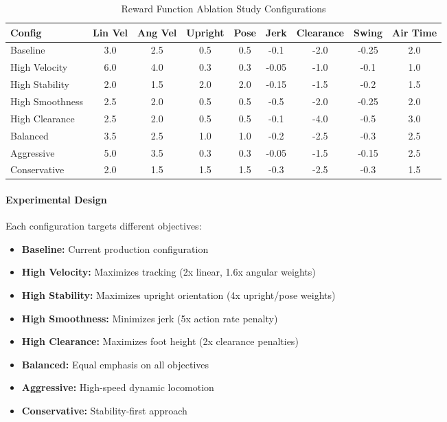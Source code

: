 \documentclass[12pt,a4paper]{article}
\begin{document}
\begin{table}[h]
\centering
\caption{Reward Function Ablation Study Configurations}
\tiny
\begin{tabular}{|l|c|c|c|c|c|c|c|c|}
\hline
\textbf{Config} & \textbf{Lin Vel} & \textbf{Ang Vel} & \textbf{Upright} & \textbf{Pose} & \textbf{Jerk} & \textbf{Clearance} & \textbf{Swing} & \textbf{Air Time} \\
\hline
Baseline & 3.0 & 2.5 & 0.5 & 0.5 & -0.1 & -2.0 & -0.25 & 2.0 \\
\hline
High Velocity & 6.0 & 4.0 & 0.3 & 0.3 & -0.05 & -1.0 & -0.1 & 1.0 \\
\hline
High Stability & 2.0 & 1.5 & 2.0 & 2.0 & -0.15 & -1.5 & -0.2 & 1.5 \\
\hline
High Smoothness & 2.5 & 2.0 & 0.5 & 0.5 & -0.5 & -2.0 & -0.25 & 2.0 \\
\hline
High Clearance & 2.5 & 2.0 & 0.5 & 0.5 & -0.1 & -4.0 & -0.5 & 3.0 \\
\hline
Balanced & 3.5 & 2.5 & 1.0 & 1.0 & -0.2 & -2.5 & -0.3 & 2.5 \\
\hline
Aggressive & 5.0 & 3.5 & 0.3 & 0.3 & -0.05 & -1.5 & -0.15 & 2.5 \\
\hline
Conservative & 2.0 & 1.5 & 1.5 & 1.5 & -0.3 & -2.5 & -0.3 & 1.5 \\
\hline
\end{tabular}
\end{table}

\paragraph{Experimental Design}
Each configuration targets different objectives:
\begin{itemize}
    \item \textbf{Baseline:} Current production configuration
    \item \textbf{High Velocity:} Maximizes tracking (2x linear, 1.6x angular weights)
    \item \textbf{High Stability:} Maximizes upright orientation (4x upright/pose weights)
    \item \textbf{High Smoothness:} Minimizes jerk (5x action rate penalty)
    \item \textbf{High Clearance:} Maximizes foot height (2x clearance penalties)
    \item \textbf{Balanced:} Equal emphasis on all objectives
    \item \textbf{Aggressive:} High-speed dynamic locomotion
    \item \textbf{Conservative:} Stability-first approach
\end{itemize}
\end{document}

